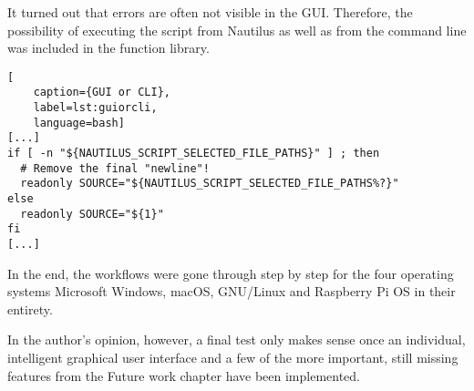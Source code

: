 It turned out that errors are often not visible in the GUI. Therefore, the possibility of executing the script from Nautilus as well as from the command line was included in the function library.

\begin{lstlisting}[
    caption={GUI or CLI},
    label=lst:guiorcli,
    language=bash]
[...]
if [ -n "${NAUTILUS_SCRIPT_SELECTED_FILE_PATHS}" ] ; then
  # Remove the final "newline"!
  readonly SOURCE="${NAUTILUS_SCRIPT_SELECTED_FILE_PATHS%?}"
else
  readonly SOURCE="${1}"
fi
[...]
\end{lstlisting}

In the end, the workflows were gone through step by step for the four operating systems Microsoft Windows, macOS, GNU/Linux and Raspberry Pi OS in their entirety.

In the author's opinion, however, a final test only makes sense once an individual, intelligent graphical user interface and a few of the more important, still missing features from the Future work chapter have been implemented.
